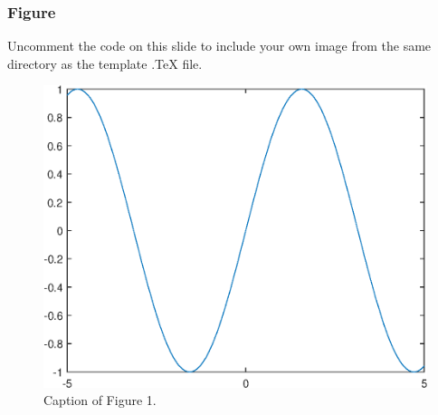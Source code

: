 \documentclass[11pt,compress]{beamer}
\numberwithin{thm}{section}
\numberwithin{defn}{section}
\numberwithin{lmm}{section}
\theoremstyle{example}
\numberwithin{figure}{section}
\numberwithin{table}{section}
\numberwithin{equation}{section}
\begin{document}
\begin{frame}
\frametitle{Figure}

Uncomment the code on this slide to include your own image from the same directory as the template .TeX file.
\begin{figure}[htp!]
\centering
\includegraphics[width=0.5\linewidth]{image1}
\caption{Caption of Figure 1.} \label{fig:A}
\end{figure}
\end{frame}

\end{document}
